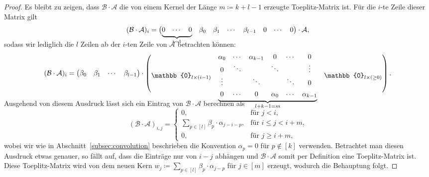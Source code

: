 \documentclass[paper=a4, 	%
		fontsize=11pt, 		%
		abstracton, 	%
		headsepline, 	%
		notitlepage	%
		]{scrartcl}
\theoremstyle{definition}
\newcommand{\fNat}[1]{[ #1 ]}
\begin{document}
\begin{proof}
    Es bleibt zu zeigen, dass $\mathcal{B}\cdot \mathcal{A}$ die von einem Kernel der Länge $m\coloneqq k+l-1$ erzeugte Toeplitz-Matrix ist. 
    Für die $i$-te Zeile dieser Matrix gilt
    \[
        (\mathcal{B} \cdot \mathcal{A})_i
        = \begin{pmatrix}
                \smash[b]{\underbrace{\begin{matrix}0 & \cdots & 0\end{matrix}}_{i-1}} & \beta_0 & \beta_1 & \cdots & \beta_{l-1} & 0 & \cdots & 0
            \end{pmatrix} \cdot \mathcal{A}, \\[1em]
    \]
    sodass wir lediglich die $l$ Zeilen ab der $i$-ten Zeile von $\mathcal{A}$ betrachten können:
    \[
        (\mathcal{B} \cdot \mathcal{A})_i = 
            \begin{pmatrix}
                \beta_0 & \beta_1 & \cdots & \beta_{l-1}
            \end{pmatrix} \cdot \begin{pmatrix}
                \mathbb{0}_{l\times (i-1)} & \smash[b]{\underbrace{\begin{matrix}
                    \alpha_0 & \cdots & \alpha_{k-1} & 0 & \cdots & 0 \\
                    0 & \ddots & & \ddots  & & \vdots \\
                    \vdots  & & \ddots & & \ddots & 0 \\[4pt]
                    0 & \cdots & 0 & \alpha_0 & \cdots & \alpha_{k-1} \\
            \end{matrix}}_{l + k - 1 = m}} & \mathbb{0}_{l\times (\geq 0)}\\[2em]
        \end{pmatrix}. \\[2em]
    \]
    Ausgehend von diesem Ausdruck lässt sich ein Eintrag von $\mathcal{B}\cdot \mathcal{A}$ berechnen als
    \[
        (\mathcal{B}\cdot \mathcal{A})_{i,j} = \begin{cases}
            0, & \text{für $j < i$,}\\
            \sum_{p\in \fNat{l}} \beta_{p} \cdot \alpha_{j - i - p}, & \text{für $i \leq j < i+m$,}\\
            0, & \text{für $j \geq i+m$,}
        \end{cases}
    \]
    wobei wir wie in Abschnitt~\ref{subsec:convolution} beschrieben die Konvention $\alpha_p = 0$ für $p\notin \fNat{k}$ verwenden.
    Betrachtet man diesen Ausdruck etwas genauer, so fällt auf, dass die Einträge nur von $i-j$ abhängen und $\mathcal{B}\cdot \mathcal{A}$ somit per Definition eine Toeplitz-Matrix ist.
    Diese Toeplitz-Matrix wird von dem neuen Kern $w_j \coloneqq \sum_{p\in\fNat{l}} \beta_p \cdot \alpha_{j - p}$ für $j\in\fNat{m}$ erzeugt, wodurch die Behauptung folgt.
\end{proof}
\end{document}
